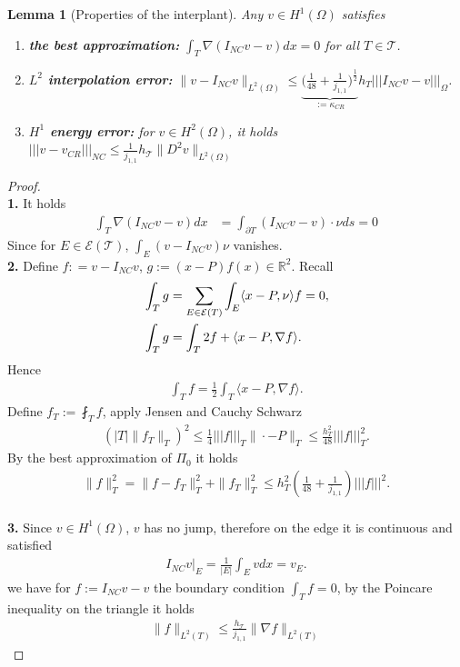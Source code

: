\documentclass[a4paper,12pt,oneside,fleqn]{book}
\newtheorem{lemma}[theorem]{Lemma}
\theoremstyle{definition}
\theoremstyle{remark}
\let\div\relax
\DeclareMathOperator{\div}{div}
\begin{document}
\begin{lemma}[Properties of the interplant]
	Any $v \in H^1(\Omega)$ satisfies
	\begin{enumerate}
		\item \textbf{the best approximation:} $\int_T \nabla(I_{NC}v - v ) dx = 0$ for all $T \in \mathcal{T}$. 
		\item \textbf{$L^2$ interpolation error:} $\| v - I_{NC} v \|_{L^2(\Omega)} \le \underbrace{ \bigg( \frac{1}{48} +  \frac{1}{j_{1, 1}}\bigg)^{\frac{1}{2}}}_{:= \kappa_{CR}} h_T ||| I_{NC} v - v  |||_\Omega$. 
		\item \textbf{$H^1$ energy error: }for $v \in H^2(\Omega)$, it holds $|||v - v_{CR}|||_{NC} \le \frac{1}{j_{1, 1}}h_{\mathcal{T}} \| D^2 v \|_{L^2(\Omega)}$
	\end{enumerate}
\end{lemma}
\begin{proof}
	\quad\\
	\textbf{1.} It holds
	\begin{align*}
		\int_T \nabla (I_{NC} v - v )dx &= \int_{\partial T}(I_{NC} v - v) \cdot \nu ds  = 0
	\end{align*}
	Since for $E \in \mathcal{E}(\mathcal{T})$, $\int_E (v - I_{NC}v) \nu$ vanishes. 
	\quad\\
	\textbf{2.} Define $f: = v - I_{NC}v$, $g:= (x - P) f(x) \in \mathbb{R}^2$. Recall
	\begin{align*}
		&\int_T \div g = \sum_{E \in \mathcal{E}(T)} \int_E \langle x - P, \nu \rangle f = 0,  \\
		&\int_T \div g = \int_T 2f + \langle x - P, \nabla f\rangle.
	\end{align*}
	Hence 
	\begin{align*}
		\int_T f = \frac{1}{2} \int_T \langle x - P, \nabla f \rangle. 
	\end{align*}
	Define $f_T:= \fint_T f$,  apply Jensen and Cauchy Schwarz
	\begin{align*}
		(|T| \|f_T\|_T)^2 \le \frac{1}{4}|||f|||_T \|\cdot - P\|_T \le \frac{h_T^2}{48}|||f|||_T^2.
	\end{align*}
	By the best approximation of $\Pi_0$ it holds
	\begin{align*}
		\|f\|_T^2 = \|f  - f_T\|^2_T + \|f_T\|_T^2 
		\le h_T^2( \frac{1}{48} + \frac{1}{j_{1, 1}})|||f|||^2.
	\end{align*}
	\quad\\
	\textbf{3.} Since $v \in H^1(\Omega)$, $v$ has no jump, therefore on the edge it is continuous and satisfied
	\begin{align*}
		I_{NC} v |_E = \frac{1}{|E|} \int_E v dx = v_E. 
	\end{align*}
	we have for $f:= I_{NC} v - v$ the boundary condition $\int_T f = 0$, by the Poincare inequality on the triangle it holds
	\begin{align*}
		 \|f\|_{L^2(T)} \le \frac{h_\mathcal{T}}{j_{1, 1}}\|\nabla f\|_{L^2(T)}
	\end{align*}
\end{proof}
\end{document}
